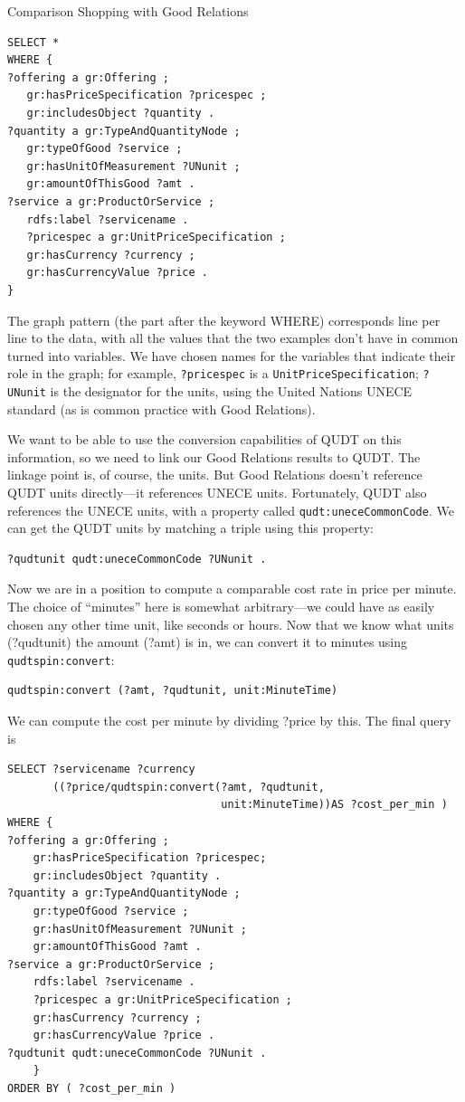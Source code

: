 \begin{challenge}{Comparison Shopping with Good Relations}
\begin{lstlisting}
SELECT *
WHERE {
?offering a gr:Offering ;
   gr:hasPriceSpecification ?pricespec ;
   gr:includesObject ?quantity .
?quantity a gr:TypeAndQuantityNode ;
   gr:typeOfGood ?service ;
   gr:hasUnitOfMeasurement ?UNunit ;
   gr:amountOfThisGood ?amt .
?service a gr:ProductOrService ;
   rdfs:label ?servicename .
   ?pricespec a gr:UnitPriceSpecification ;
   gr:hasCurrency ?currency ;
   gr:hasCurrencyValue ?price .
}
\end{lstlisting}

The graph pattern (the part after the keyword WHERE) corresponds line
per line to the data, with all the values that the two examples don't
have in common turned into variables. We have chosen names for the
variables that indicate their role in the graph; for example, \texttt{?pricespec}
is a \texttt{UnitPriceSpecification}; \texttt{?UNunit} is the designator for the units,
using the United Nations UNECE standard (as is common practice with Good
Relations).

We want to be able to use the conversion capabilities of QUDT on this
information, so we need to link our Good Relations results to QUDT. The
linkage point is, of course, the units. But Good Relations doesn't
reference QUDT units directly---it references UNECE units. Fortunately,
QUDT also references the UNECE units, with a property called
\texttt{qudt:uneceCommonCode}. We can get the QUDT units by matching a triple
using this property:

\begin{lstlisting}
?qudtunit qudt:uneceCommonCode ?UNunit .
\end{lstlisting}

Now we are in a position to compute a comparable cost rate in price per
minute. The choice of ``minutes'' here is somewhat arbitrary---we could
have as easily chosen any other time unit, like seconds or hours. Now
that we know what units (?qudtunit) the amount (?amt) is in, we can
convert it to minutes using \texttt{qudtspin:convert}:

\begin{lstlisting}
qudtspin:convert (?amt, ?qudtunit, unit:MinuteTime)
\end{lstlisting}

We can compute the cost per minute by dividing ?price by this. The final
query is

\begin{lstlisting}
SELECT ?servicename ?currency
       ((?price/qudtspin:convert(?amt, ?qudtunit,
                                 unit:MinuteTime))AS ?cost_per_min )
WHERE {
?offering a gr:Offering ;
    gr:hasPriceSpecification ?pricespec;
    gr:includesObject ?quantity .
?quantity a gr:TypeAndQuantityNode ;
    gr:typeOfGood ?service ;
    gr:hasUnitOfMeasurement ?UNunit ;
    gr:amountOfThisGood ?amt .
?service a gr:ProductOrService ;
    rdfs:label ?servicename .
    ?pricespec a gr:UnitPriceSpecification ;
    gr:hasCurrency ?currency ;
    gr:hasCurrencyValue ?price .
?qudtunit qudt:uneceCommonCode ?UNunit .
    }
ORDER BY ( ?cost_per_min )
\end{lstlisting}


\end{challenge}
